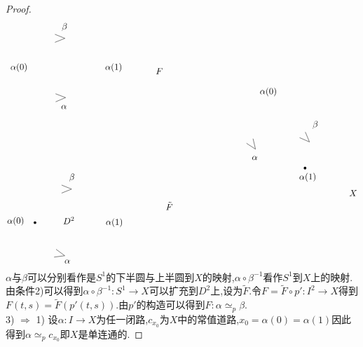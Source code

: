 \documentclass{article}
\begin{document}
\begin{proof}
\[\begin{tikzpicture}[x=0.75pt,y=0.75pt,yscale=-1,xscale=1]
\draw  [line width=3] [line join = round][line cap = round] (75.11,322.22) .. controls (75.11,322.22) and (75.11,322.22) .. (75.11,322.22) ;
\draw   (115,265.94) -- (130,271.97) -- (115,278) ;
\draw   (106.73,362.26) -- (119.77,371.83) -- (103.74,373.95) ;
\draw   (105.91,129.06) -- (121,134.85) -- (106.1,141.12) ;
\draw   (105,39.94) -- (120,45.97) -- (105,52) ;
\draw  [line width=3] [line join = round][line cap = round] (480.11,240.44) .. controls (480.11,240.44) and (480.11,240.44) .. (480.11,240.44) ;
\draw   (402.14,196.37) -- (405.8,212.11) -- (392.26,203.28) ;
\draw   (480.52,186.39) -- (486.77,201.31) -- (471.94,194.87) ;

\draw (114,21.84) node [anchor=north west][inner sep=0.75pt]    {$\beta $};
\draw (37,81.84) node [anchor=north west][inner sep=0.75pt]    {$\alpha ( 0)$};
\draw (179,81.84) node [anchor=north west][inner sep=0.75pt]    {$\alpha ( 1)$};
\draw (113,144.84) node [anchor=north west][inner sep=0.75pt]    {$\alpha $};
\draw (180,314.29) node [anchor=north west][inner sep=0.75pt]    {$\alpha ( 1)$};
\draw (116,312.29) node [anchor=north west][inner sep=0.75pt]    {$D^{2}$};
\draw (545,272.29) node [anchor=north west][inner sep=0.75pt]    {$X$};
\draw (255,89.29) node [anchor=north west][inner sep=0.75pt]    {$F$};
\draw (270,290.29) node [anchor=north west][inner sep=0.75pt]    {$\tilde{F}$};
\draw (32,312.29) node [anchor=north west][inner sep=0.75pt]    {$\alpha ( 0)$};
\draw (118.06,376.4) node [anchor=north west][inner sep=0.75pt]    {$\alpha $};
\draw (125.11,247.62) node [anchor=north west][inner sep=0.75pt]    {$\beta $};
\draw (470,246.4) node [anchor=north west][inner sep=0.75pt]    {$\alpha ( 1)$};
\draw (411,118.29) node [anchor=north west][inner sep=0.75pt]    {$\alpha ( 0)$};
\draw (399.06,221.18) node [anchor=north west][inner sep=0.75pt]    {$\alpha $};
\draw (490.11,168.62) node [anchor=north west][inner sep=0.75pt]    {$\beta $};
\end{tikzpicture}\]    
    $\alpha$与$\beta$可以分别看作是$S^1$的下半圆与上半圆到$X$的映射,$\alpha \circ \beta^{-1}$看作$S^1$到$X$上的映射.由条件2)可以得到$\alpha \circ \beta^{-1}: S^1 \to X$可以扩充到$D^2$上,设为$\tilde{F}$.令$F = \tilde{F} \circ p': I^2 \to X$得到$F(t,s) = \tilde{F}(p'(t,s))$.由$p'$的构造可以得到$F : \alpha \simeq_p \beta$.\\
    3) $\Rightarrow$ 1) 设$\alpha : I \to X$为任一闭路,$c_{x_0}$为$X$中的常值道路,$x_0 = \alpha(0) = \alpha(1)$因此得到$\alpha \simeq_p c_{x_0}$即$X$是单连通的.
\end{proof}
\end{document}
